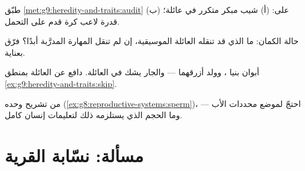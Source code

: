 \begin{exercise}[$\star\star$]\label{exo:g9:heredity-and-traits:9}
طبّق \cref{met:g9:heredity-and-traits:audit} على: (أ)
شيب مبكر متكرر في عائلة؛ (ب) قدرة لاعب كرة قدم على
التحمل.
\end{exercise}

\begin{exercise}[$\star\star$]\label{exo:g9:heredity-and-traits:10}
حالة الكمان: ما الذي قد تنقله العائلة الموسيقية، إن لم
تنقل المهارة المدرَّبة أبدًا؟ فرّق بعناية.
\end{exercise}

\begin{exercise}[$\star\star$]\label{exo:g9:heredity-and-traits:11}
أبوان بنيا ، وولد أزرقهما --- والجار يشك في
العائلة. دافع عن العائلة بمنطق
\cref{ex:g9:heredity-and-traits:skip}.
\end{exercise}

\begin{exercise}[$\star\star\star$]\label{exo:g9:heredity-and-traits:12}
من تشريح  وحده
(\cref{ex:g8:reproductive-systems:sperm})، احتجّ لموضع
محددات الأب --- وما الحجم الذي يستلزمه ذلك لتعليمات
إنسان كامل.
\end{exercise}

\section{مسألة: نسّابة القرية}

